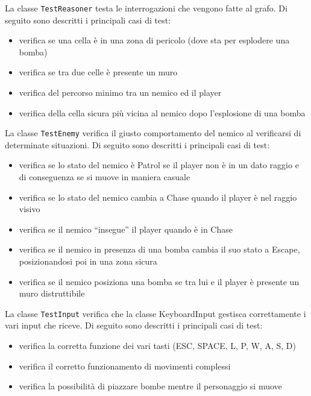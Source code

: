 \documentclass[a4paper,12pt]{report}
\begin{document}
\par
La classe \texttt{TestReasoner} testa le interrogazioni che vengono fatte al grafo. Di seguito sono descritti i principali casi di test:
\begin{itemize}
    \item verifica se una cella è in una zona di pericolo (dove sta per esplodere una bomba)
    \item verifica se tra due celle è presente un muro
    \item verifica del percorso minimo tra un nemico ed il player
    \item verifica della cella sicura più vicina al nemico dopo l’esplosione di una bomba
\end{itemize}

\par
La classe \texttt{TestEnemy} verifica il giusto comportamento del nemico al verificarsi di determinate situazioni. Di seguito sono descritti i principali casi di test:
\begin{itemize}
    \item verifica se lo stato del nemico è Patrol se il player non è in un dato raggio e di conseguenza se si muove in maniera casuale
    \item verifica se lo stato del nemico cambia a Chase quando il player è nel raggio visivo
    \item verifica se il nemico “insegue” il player quando è in Chase
    \item verifica se il nemico in presenza di una bomba cambia il suo stato a Escape, posizionandosi poi in una zona sicura
    \item verifica se il nemico posiziona una bomba se tra lui e il player è presente un muro distruttibile
\end{itemize}

\par
La classe \texttt{TestInput} verifica che la classe KeyboardInput gestisca correttamente i vari input che riceve. Di seguito sono descritti i principali casi di test:
\begin{itemize}
    \item verifica la corretta funzione dei vari tasti (ESC, SPACE, L, P, W, A, S, D)
    \item verifica il corretto funzionamento di movimenti complessi
    \item verifica la possibilità di piazzare bombe mentre il personaggio si muove
\end{itemize}
\end{document}
